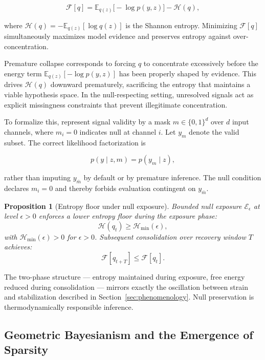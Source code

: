 \documentclass[11pt]{article}
\newtheorem{proposition}{Proposition}
\theoremstyle{remark}
\begin{document}
\begin{equation}
\mathcal{F}[q] = \mathbb{E}_{q(z)}\bigl[-\log p(y,z)\bigr] - \mathcal{H}(q),
\label{eq:vfe}
\end{equation}

where $\mathcal{H}(q) = -\mathbb{E}_{q(z)}[\log q(z)]$ is the Shannon entropy. Minimizing $\mathcal{F}[q]$ simultaneously maximizes model evidence and preserves entropy against over-concentration.

Premature collapse corresponds to forcing $q$ to concentrate excessively before the energy term $\mathbb{E}_{q(z)}[-\log p(y,z)]$ has been properly shaped by evidence. This drives $\mathcal{H}(q)$ downward prematurely, sacrificing the entropy that maintains a viable hypothesis space. In the null-respecting setting, unresolved signals act as explicit missingness constraints that prevent illegitimate concentration.

To formalize this, represent signal validity by a mask $m \in \{0,1\}^d$ over $d$ input channels, where $m_i = 0$ indicates null at channel $i$. Let $y_m$ denote the valid subset. The correct likelihood factorization is

\[
p(y \mid z, m) = p(y_m \mid z),
\]

rather than imputing $y_{\bar{m}}$ by default or by premature inference. The null condition declares $m_i = 0$ and thereby forbids evaluation contingent on $y_{\bar{m}}$.

\begin{proposition}[Entropy floor under null exposure]
Bounded null exposure $\mathcal{E}_\epsilon$ at level $\epsilon > 0$ enforces a lower entropy floor during the exposure phase:
\[
\mathcal{H}(q_t) \geq \mathcal{H}_{\min}(\epsilon),
\]
with $\mathcal{H}_{\min}(\epsilon) > 0$ for $\epsilon > 0$. Subsequent consolidation over recovery window $T$ achieves:
\[
\mathcal{F}[q_{t+T}] \leq \mathcal{F}[q_t].
\]
\end{proposition}

The two-phase structure --- entropy maintained during exposure, free energy reduced during consolidation --- mirrors exactly the oscillation between strain and stabilization described in Section~\ref{sec:phenomenology}. Null preservation is thermodynamically responsible inference.

\subsection{Geometric Bayesianism and the Emergence of Sparsity}
\end{document}
